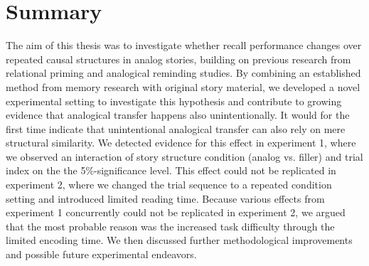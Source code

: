 \documentclass[a4paper,man,natbib,floatsintext,import]{apa6}
\begin{document}
\section{Summary}
The aim of this thesis was to investigate whether recall performance changes over repeated causal structures in analog stories, building on previous research from relational priming and analogical reminding studies. By combining an established method from memory research with original story material, we developed a novel experimental setting to investigate this hypothesis and contribute to growing evidence that analogical transfer happens also unintentionally. It would for the first time indicate that unintentional analogical transfer can also rely on mere structural similarity. We detected evidence for this effect in experiment 1, where we observed an interaction of story structure condition (analog vs. filler) and trial index on the the 5\%-significance level. This effect could not be replicated in experiment 2, where we changed the trial sequence to a repeated condition setting and introduced limited reading time. Because various effects from experiment 1 concurrently could not be replicated in experiment 2, we argued that the most probable reason was the increased task difficulty through the limited encoding time. We then discussed further methodological improvements and possible future experimental endeavors.





\end{document}
